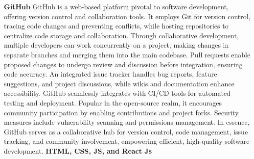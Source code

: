 \newline
\newline
\textbf{GitHub}
\newline
GitHub is a web-based platform pivotal to software development, offering version control and collaboration tools. It employs Git for version control, tracing code changes and preventing conflicts, while hosting repositories to centralize code storage and collaboration. Through collaborative development, multiple developers can work concurrently on a project, making changes in separate branches and merging them into the main codebase. Pull requests enable proposed changes to undergo review and discussion before integration, ensuring code accuracy. An integrated issue tracker handles bug reports, feature suggestions, and project discussions, while wikis and documentation enhance accessibility. GitHub seamlessly integrates with CI/CD tools for automated testing and deployment. Popular in the open-source realm, it encourages community participation by enabling contributions and project forks. Security measures include vulnerability scanning and permissions management. In essence, GitHub serves as a collaborative hub for version control, code management, issue tracking, and community involvement, empowering efficient, high-quality software development.
\newline
\newline
\textbf{HTML, CSS, JS, and React Js}
